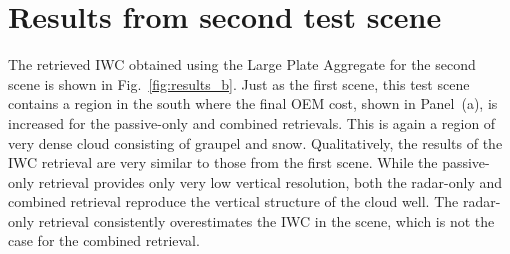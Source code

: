 \documentclass[journal abbreviation, manuscript]{copernicus}
\begin{document}






\clearpage
\appendix


\section{Results from second test scene}
\label{app:results_b}

The retrieved IWC obtained using the Large Plate Aggregate for the second scene
is shown in Fig.~\ref{fig:results_b}. Just as the first scene, this test scene
contains a region in the south where the final OEM cost, shown in Panel~(a), is
increased for the passive-only and combined retrievals. This is again a region
of very dense cloud consisting of graupel and snow. Qualitatively, the results
of the IWC retrieval are very similar to those from the first scene. While the
passive-only retrieval provides only very low vertical resolution, both the
radar-only and combined retrieval reproduce the vertical structure of the cloud
well. The radar-only retrieval consistently overestimates the IWC in the scene,
which is not the case for the combined retrieval.
\end{document}

